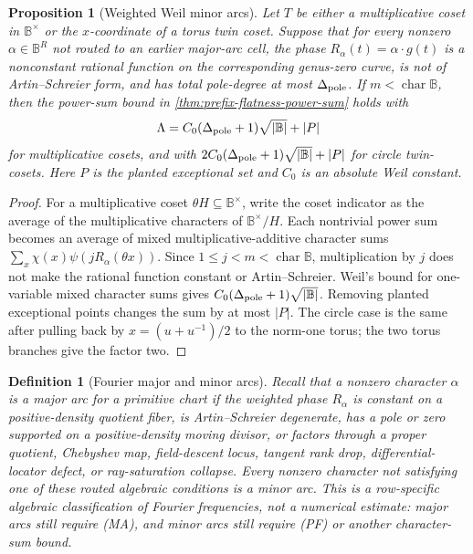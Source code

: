 \documentclass[12pt,a4paper]{amsart}
\numberwithin{equation}{section}
\newtheorem{proposition}[proposition]{Proposition}
\newtheorem{definition}[definition]{Definition}
\theoremstyle{remark}
\newcommand{\B}{\mathbb B}
\newcommand{\abs}[1]{\lvert #1\rvert}
\begin{document}
\begin{proposition}[Weighted Weil minor arcs]\label{prop:weighted-weil-minor-arcs}
Let \(T\) be either a multiplicative coset in \(\B^\times\) or the \(x\)-coordinate of a torus twin coset.  Suppose that for every nonzero \(\alpha\in\B^R\) not routed to an earlier major-arc cell, the phase \(R_\alpha(t)=\alpha\cdot g(t)\) is a nonconstant rational function on the corresponding genus-zero curve, is not of Artin--Schreier form, and has total pole-degree at most \(\Delta_{\rm pole}\).  If \(m<\operatorname{char}\B\), then the power-sum bound in \cref{thm:prefix-flatness-power-sum} holds with
\[
        \Lambda=C_0(\Delta_{\rm pole}+1)\sqrt{\abs\B}+\abs P
\]
for multiplicative cosets, and with \(2C_0(\Delta_{\rm pole}+1)\sqrt{\abs\B}+\abs P\) for circle twin-cosets.  Here \(P\) is the planted exceptional set and \(C_0\) is an absolute Weil constant.
\end{proposition}

\begin{proof}
For a multiplicative coset \(\theta H\subseteq\B^\times\), write the coset indicator as the average of the multiplicative characters of \(\B^\times/H\).  Each nontrivial power sum becomes an average of mixed multiplicative-additive character sums \(\sum_x\chi(x)\psi(jR_\alpha(\theta x))\).  Since \(1\le j<m<\operatorname{char}\B\), multiplication by \(j\) does not make the rational function constant or Artin--Schreier.  Weil's bound for one-variable mixed character sums gives \(C_0(\Delta_{\rm pole}+1)\sqrt{\abs\B}\).  Removing planted exceptional points changes the sum by at most \(\abs P\).  The circle case is the same after pulling back by \(x=(u+u^{-1})/2\) to the norm-one torus; the two torus branches give the factor two.
\end{proof}

\begin{definition}[Fourier major and minor arcs]\label{def:major-arc}
Recall that a nonzero character \(\alpha\) is a major arc for a primitive chart if the weighted phase \(R_\alpha\) is constant on a positive-density quotient fiber, is Artin--Schreier degenerate, has a pole or zero supported on a positive-density moving divisor, or factors through a proper quotient, Chebyshev map, field-descent locus, tangent rank drop, differential-locator defect, or ray-saturation collapse.
Every nonzero character not satisfying one of these routed algebraic
conditions is a minor arc.  This is a row-specific algebraic
classification of Fourier frequencies, not a numerical estimate: major
arcs still require \textup{(MA)}, and minor arcs still require
\textup{(PF)} or another character-sum bound.
\end{definition}
\end{document}
